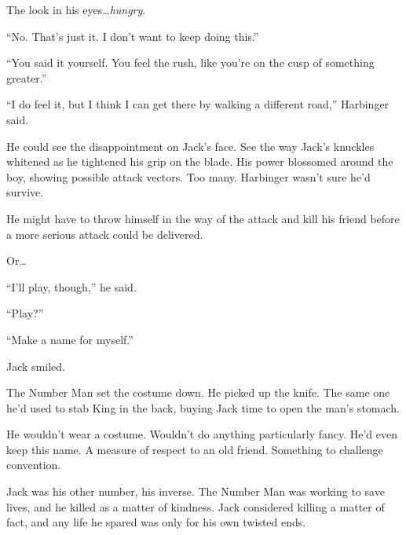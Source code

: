 The look in his eyes\ldots \emph{hungry}.



``No.  That's just it.  I don't want to keep doing this.''



``You said it yourself.  You feel the rush, like you're on the cusp of something greater.''



``I do feel it, but I think I can get there by walking a different road,'' Harbinger said.



He could see the disappointment on Jack's face.  See the way Jack's knuckles whitened as he tightened his grip on the blade.  His power blossomed around the boy, showing possible attack vectors.  Too many.  Harbinger wasn't sure he'd survive.



He might have to throw himself in the way of the attack and kill his friend before a more serious attack could be delivered.



Or\ldots



``I'll play, though,'' he said.



``Play?''



``Make a name for myself.''



Jack smiled.



\sectionbreak






The Number Man set the costume down.  He picked up the knife.  The same one he'd used to stab King in the back, buying Jack time to open the man's stomach.



He wouldn't wear a costume.  Wouldn't do anything particularly fancy.  He'd even keep this name.  A measure of respect to an old friend.  Something to challenge convention.



Jack was his other number, his inverse.  The Number Man was working to save lives, and he killed as a matter of kindness.  Jack considered killing a matter of fact, and any life he spared was only for his own twisted ends.



